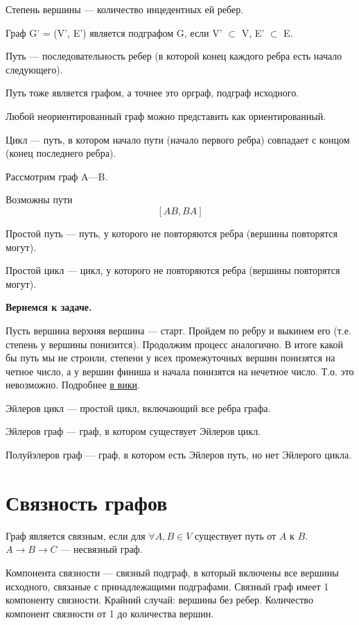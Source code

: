 Степень вершины --- количество инцедентных ей ребер.

Граф G' = (V', E') является подграфом G, если V' $\subset$ V, E' $\subset$ E.

Путь --- последовательность ребер (в которой конец каждого ребра есть начало следующего).

Путь тоже является графом, а точнее это орграф, подграф исходного.

Любой неориентированный граф можно представить как ориентированный.

Цикл --- путь, в котором начало пути (начало первого ребра) совпадает с концом (конец последнего ребра).

Рассмотрим граф A---B.

Возможны пути
$$[AB, BA]$$

Простой путь --- путь, у которого не повторяются ребра (вершины повторятся могут).

Простой цикл ---  цикл, у которого не повторяются ребра (вершины повторятся могут).

\textbf{Вернемся к задаче.}

Пусть вершина верхняя вершина --- старт. Пройдем по ребру и выкинем его (т.е. степень у вершины понизится). Продолжим процесс аналогично. В итоге какой бы путь мы не строили, степени у всех промежуточных вершин понизятся на четное число, а у вершин финиша и начала понизятся на нечетное число. Т.о. это невозможно. Подробнее \href{https://ru.wikipedia.org/wiki/%D0%97%D0%B0%D0%B4%D0%B0%D1%87%D0%B0_%D0%BE_%D1%81%D0%B5%D0%BC%D0%B8_%D0%BA%D1%91%D0%BD%D0%B8%D0%B3%D1%81%D0%B1%D0%B5%D1%80%D0%B3%D1%81%D0%BA%D0%B8%D1%85_%D0%BC%D0%BE%D1%81%D1%82%D0%B0%D1%85}{в вики}.

Эйлеров цикл --- простой цикл, включающий все ребра графа.

Эйлеров граф --- граф, в котором существует Эйлеров цикл.

Полуйэлеров граф --- граф, в котором есть Эйлеров путь, но нет Эйлерого цикла.

\section{Связность графов}
Граф является связным, если для $\forall A,B \in V$ существует путь от $A$ к $B$.\\
$A\longrightarrow B\longrightarrow C$ --- несвязный граф.

Компонента связности --- связный подграф, в который включены все вершины исходного, связаные с принадлежащими подграфами. Связный граф имеет 1 компоненту связности. Крайний случай: вершины без ребер. Количество компонент связности от 1 до количества вершин.

